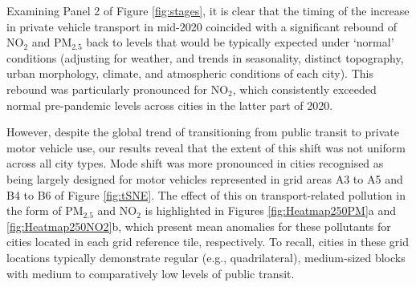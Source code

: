 \documentclass[preprint,10pt]{elsarticle} %
\begin{document}
Examining Panel 2 of Figure \ref{fig:stages}, it is clear that the timing of the increase in private vehicle transport in mid-2020 coincided with a significant rebound of NO$_{2}$ and PM$_{2.5}$ back to levels that would be typically expected under `normal' conditions (adjusting for weather, and trends in seasonality, distinct topography, urban morphology, climate, and atmospheric conditions of each city\cite{Wijnands2022}). This rebound was particularly pronounced for NO$_{2}$, which consistently exceeded normal pre-pandemic levels across cities in the latter part of 2020.

However, despite the global trend of transitioning from public transit to private motor vehicle use\cite{fernando2023shaping}, our results reveal that the extent of this shift was not uniform across all city types. Mode shift  was more pronounced in cities recognised as being largely designed for motor vehicles\cite{Thompson2020} represented in grid areas A3 to A5 and B4 to B6 of Figure \ref{fig:tSNE}. The effect of this on transport-related pollution in the form of PM$_{2.5}$ and NO$_{2}$ is highlighted in Figures \ref{fig:Heatmap250PM}a and \ref{fig:Heatmap250NO2}b, which present mean anomalies for these pollutants for cities located in each grid reference tile, respectively. To recall, cities in these grid locations typically demonstrate regular (e.g., quadrilateral), medium-sized blocks with medium to comparatively low levels of public transit.
\end{document}
